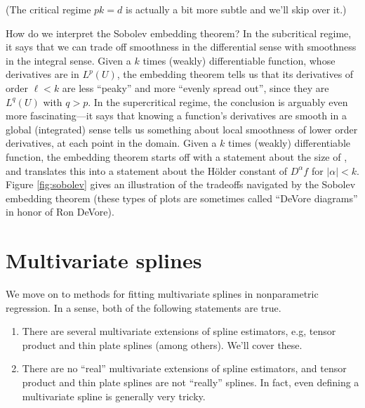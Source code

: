 \documentclass{article}
\begin{document}


\medskip
(The critical regime $pk = d$ is actually a bit more subtle and we'll skip over
it.)  

How do we interpret the Sobolev embedding theorem? In the subcritical regime, it
says that we can trade off smoothness in the differential sense with smoothness
in the integral sense. Given a $k$ times (weakly) differentiable function, whose
derivatives are in $L^p(U)$, the embedding theorem tells us that its derivatives
of order $\ell < k$ are less ``peaky'' and more ``evenly spread out'', since
they are $L^q(U)$ with $q > p$.
In the supercritical regime, the conclusion is arguably even more
fascinating---it says that knowing a function's derivatives are smooth in a
global (integrated) sense tells us something about local smoothness of lower
order derivatives, at each point in the domain. Given a $k$ times (weakly)
differentiable function, the embedding theorem starts off with a statement about
the size of , and
translates this into a statement about the H{\"o}lder constant of $D^\alpha f$
for $|\alpha| < k$.      
Figure \ref{fig:sobolev} gives an illustration of the tradeoffs navigated by the
Sobolev embedding theorem (these types of plots are sometimes called ``DeVore
diagrams'' in honor of Ron DeVore).   

\section{Multivariate splines}

We move on to methods for fitting multivariate splines in nonparametric
regression. In a sense, both of the following statements are true. 

\begin{enumerate}
\item There are several multivariate extensions of spline estimators, e.g,
  tensor product and thin plate splines (among others). We'll cover these.  
\item There are no ``real'' multivariate extensions of spline estimators, and
  tensor product and thin plate splines are not ``really'' splines. In fact,
  even defining a multivariate spline is generally very tricky.  
\end{enumerate}
\end{document}
